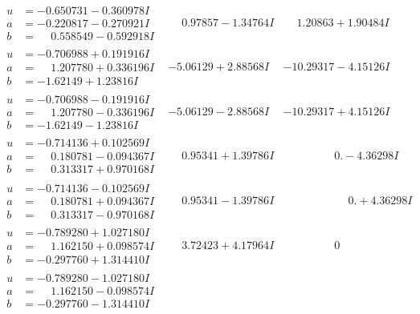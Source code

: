 \documentclass[1p]{elsarticle_modified}
\theoremstyle{definition}
\begin{document}
$$\begin{array}{c|c|c}
\begin{aligned}
u &= -0.650731 - 0.360978 I \\
a &= -0.220817 - 0.270921 I \\
b &= \phantom{-}0.558549 - 0.592918 I\end{aligned}
 & \phantom{-}0.97857 - 1.34764 I & \phantom{-}1.20863 + 1.90484 I \\ \hline\begin{aligned}
u &= -0.706988 + 0.191916 I \\
a &= \phantom{-}1.207780 + 0.336196 I \\
b &= -1.62149 + 1.23816 I\end{aligned}
 & -5.06129 + 2.88568 I & -10.29317 - 4.15126 I \\ \hline\begin{aligned}
u &= -0.706988 - 0.191916 I \\
a &= \phantom{-}1.207780 - 0.336196 I \\
b &= -1.62149 - 1.23816 I\end{aligned}
 & -5.06129 - 2.88568 I & -10.29317 + 4.15126 I \\ \hline\begin{aligned}
u &= -0.714136 + 0.102569 I \\
a &= \phantom{-}0.180781 - 0.094367 I \\
b &= \phantom{-}0.313317 + 0.970168 I\end{aligned}
 & \phantom{-}0.95341 + 1.39786 I & \phantom{-0.000000 } 0. - 4.36298 I \\ \hline\begin{aligned}
u &= -0.714136 - 0.102569 I \\
a &= \phantom{-}0.180781 + 0.094367 I \\
b &= \phantom{-}0.313317 - 0.970168 I\end{aligned}
 & \phantom{-}0.95341 - 1.39786 I & \phantom{-0.000000 -}0. + 4.36298 I \\ \hline\begin{aligned}
u &= -0.789280 + 1.027180 I \\
a &= \phantom{-}1.162150 + 0.098574 I \\
b &= -0.297760 + 1.314410 I\end{aligned}
 & \phantom{-}3.72423 + 4.17964 I & \phantom{-0.000000 } 0 \\ \hline\begin{aligned}
u &= -0.789280 - 1.027180 I \\
a &= \phantom{-}1.162150 - 0.098574 I \\
b &= -0.297760 - 1.314410 I\end{aligned}

\end{array}$$
\end{document}
